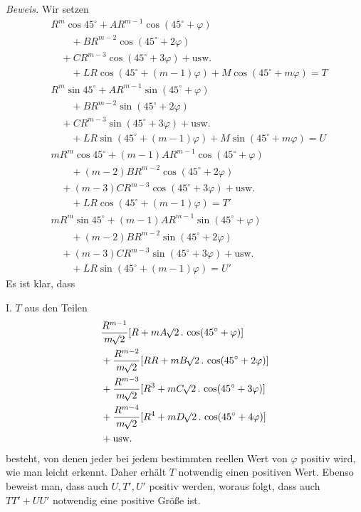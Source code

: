 \textit{Beweis.} Wir setzen
\[
\begin{aligned}
&R^m\cos45^\circ+AR^{m-1}\cos(45^\circ+\varphi)\\
&\qquad+BR^{m-2}\cos(45^\circ+2\varphi)\\
&\quad+CR^{m-3}\cos(45^\circ+3\varphi)+\text{usw.}\\
&\qquad+LR\cos(45^\circ+(m-1)\varphi)+M\cos(45^\circ+m\varphi)=T\\
&R^m\sin45^\circ+AR^{m-1}\sin(45^\circ+\varphi)\\
&\qquad+BR^{m-2}\sin(45^\circ+2\varphi)\\
&\quad+CR^{m-3}\sin(45^\circ+3\varphi)+\text{usw.}\\
&\qquad+LR\sin(45^\circ+(m-1)\varphi)+M\sin(45^\circ+m\varphi)=U\\
&mR^m\cos45^\circ+(m-1)AR^{m-1}\cos(45^\circ+\varphi)\\
&\qquad+(m-2)BR^{m-2}\cos(45^\circ+2\varphi)\\
&\quad+(m-3)CR^{m-3}\cos(45^\circ+3\varphi)+\text{usw.}\\
&\qquad+LR\cos(45^\circ+(m-1)\varphi)=T'\\
&mR^m\sin45^\circ+(m-1)AR^{m-1}\sin(45^\circ+\varphi)\\
&\qquad+(m-2)BR^{m-2}\sin(45^\circ+2\varphi)\\
&\quad+(m-3)CR^{m-3}\sin(45^\circ+3\varphi)+\text{usw.}\\
&\qquad+LR\sin(45^\circ+(m-1)\varphi)=U'
\end{aligned}
\]
Es ist klar, dass

I. $T$ aus den Teilen
\[
\begin{aligned}
&\frac{R^{m-1}}{m\BareRoot{2}}[R+mA\BareRoot{2}\, .\,\cos(45^\circ+\varphi)]\\
&+\frac{R^{m-2}}{m\BareRoot{2}}[RR+mB\BareRoot{2}\, .\,\cos(45^\circ+2\varphi)]\\
&+\frac{R^{m-3}}{m\BareRoot{2}}[R^3+mC\BareRoot{2}\, .\,\cos(45^\circ+3\varphi)]\\
&+\frac{R^{m-4}}{m\BareRoot{2}}[R^4+mD\BareRoot{2}\, .\,\cos(45^\circ+4\varphi)]\\
&+\text{usw.}
\end{aligned}
\]
besteht, von denen jeder bei jedem bestimmten reellen Wert von $\varphi$ positiv wird, wie man leicht erkennt. Daher erhält $T$ notwendig einen positiven Wert. Ebenso beweist man, dass auch $U,T',U'$ positiv werden, woraus folgt, dass auch $TT'+UU'$ notwendig eine positive Größe ist.

